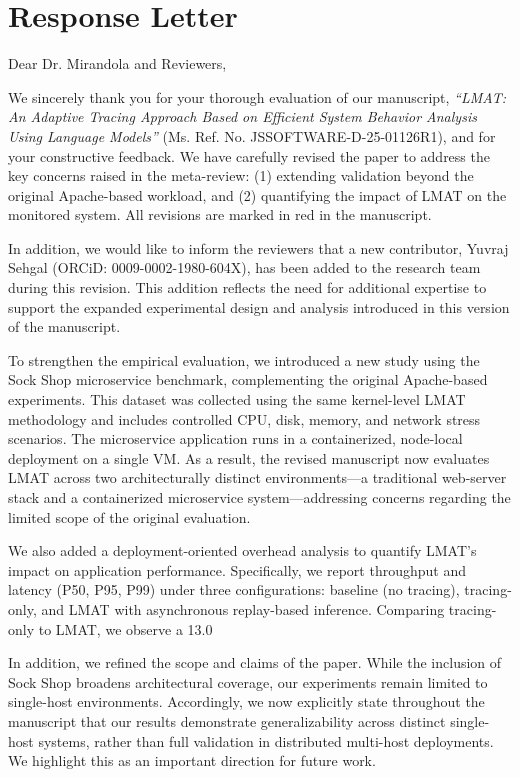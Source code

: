 \documentclass[11pt]{article}
\begin{document}
\section*{Response Letter}

Dear Dr. Mirandola and Reviewers,

We sincerely thank you for your thorough evaluation of our manuscript, \emph{``LMAT: An Adaptive Tracing Approach Based on Efficient System Behavior Analysis Using Language Models''} (Ms. Ref. No. JSSOFTWARE-D-25-01126R1), and for your constructive feedback. We have carefully revised the paper to address the key concerns raised in the meta-review: (1) extending validation beyond the original Apache-based workload, and (2) quantifying the impact of LMAT on the monitored system. All revisions are marked in red in the manuscript.

In addition, we would like to inform the reviewers that a new contributor, Yuvraj Sehgal (ORCiD: 0009-0002-1980-604X), has been added to the research team during this revision. This addition reflects the need for additional expertise to support the expanded experimental design and analysis introduced in this version of the manuscript.

To strengthen the empirical evaluation, we introduced a new study using the Sock Shop microservice benchmark, complementing the original Apache-based experiments. This dataset was collected using the same kernel-level LMAT methodology and includes controlled CPU, disk, memory, and network stress scenarios. The microservice application runs in a containerized, node-local deployment on a single VM. As a result, the revised manuscript now evaluates LMAT across two architecturally distinct environments—a traditional web-server stack and a containerized microservice system—addressing concerns regarding the limited scope of the original evaluation.

We also added a deployment-oriented overhead analysis to quantify LMAT’s impact on application performance. Specifically, we report throughput and latency (P50, P95, P99) under three configurations: baseline (no tracing), tracing-only, and LMAT with asynchronous replay-based inference. Comparing tracing-only to LMAT, we observe a 13.0%

In addition, we refined the scope and claims of the paper. While the inclusion of Sock Shop broadens architectural coverage, our experiments remain limited to single-host environments. Accordingly, we now explicitly state throughout the manuscript that our results demonstrate generalizability across distinct single-host systems, rather than full validation in distributed multi-host deployments. We highlight this as an important direction for future work.
\end{document}
